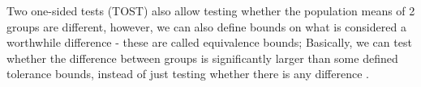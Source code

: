 Two one-sided tests (TOST) also allow testing whether the population means of 2 groups are different, however, we can also define bounds on what is considered a worthwhile difference - these are called equivalence bounds; Basically, we can test whether the difference between groups is significantly larger than some defined tolerance bounds, instead of just testing whether there is any difference \cite{tost}.
